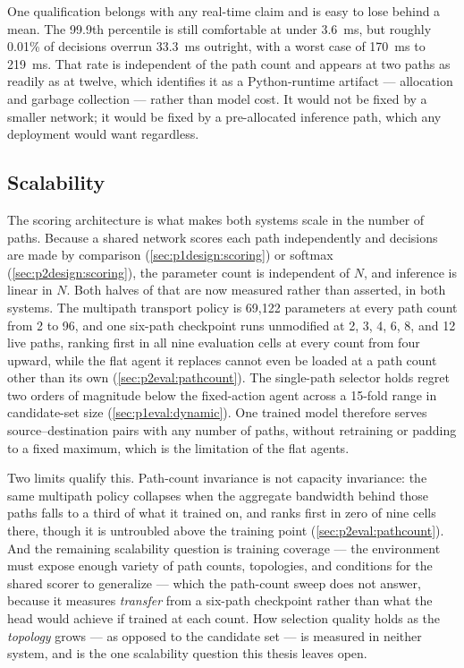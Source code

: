 One qualification belongs with any real-time claim and is easy to lose behind a mean. The 99.9th
percentile is still comfortable at under \SI{3.6}{\milli\second}, but roughly 0.01\% of decisions
overrun \SI{33.3}{\milli\second} outright, with a worst case of \SI{170}{\milli\second} to
\SI{219}{\milli\second}. That rate is independent of the path count and appears at two paths as readily
as at twelve, which identifies it as a Python-runtime artifact --- allocation and garbage collection ---
rather than model cost. It would not be fixed by a smaller network; it would be fixed by a pre-allocated
inference path, which any deployment would want regardless.

\subsection{Scalability}
\label{sec:analysis:scalability}

The scoring architecture is what makes both systems scale in the number of paths. Because a shared network
scores each path independently and decisions are made by comparison (\cref{sec:p1design:scoring}) or softmax
(\cref{sec:p2design:scoring}), the parameter count is independent of $N$, and inference is linear in $N$.
Both halves of that are now measured rather than asserted, in both systems. The multipath transport
policy is 69,122 parameters at every path count from 2 to 96, and one six-path checkpoint runs
unmodified at 2, 3, 4, 6, 8, and 12 live paths, ranking first in all nine evaluation cells at every count
from four upward, while the flat agent it replaces cannot even be loaded at a path count other than its
own (\cref{sec:p2eval:pathcount}). The single-path selector holds regret two orders of magnitude below
the fixed-action agent across a 15-fold range in candidate-set size (\cref{sec:p1eval:dynamic}). One
trained model therefore serves source--destination pairs with any number of paths, without retraining or
padding to a fixed maximum, which is the limitation of the flat agents.

Two limits qualify this. Path-count invariance is not capacity invariance: the same multipath policy
collapses when the aggregate bandwidth behind those paths falls to a third of what it trained on, and
ranks first in zero of nine cells there, though it is untroubled above the training point
(\cref{sec:p2eval:pathcount}). And the remaining scalability question is training coverage --- the
environment must expose enough variety of path counts, topologies, and conditions for the shared scorer
to generalize --- which the path-count sweep does not answer, because it measures \emph{transfer} from a
six-path checkpoint rather than what the head would achieve if trained at each count. How selection
quality holds as the \emph{topology} grows --- as opposed to the candidate set --- is measured in
neither system, and is the one scalability question this thesis leaves open.

